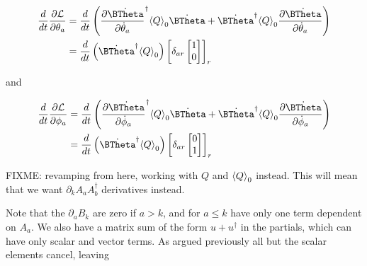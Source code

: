 \begin{align*}
\frac{d}{dt} \PD{\theta_a}{\LL}
&=
\frac{d}{dt} 
\left(
\PD{\dot{\theta}_a}{\dot{\BTheta}}^\dagger
\gpgradezero{Q} 
\dot{\BTheta}
+
\dot{\BTheta}^\dagger
\gpgradezero{Q} 
\PD{\dot{\theta}_a}{\dot{\BTheta}}
\right)  \\
&=
\frac{d}{dt} \left(
\dot{\BTheta}^\dagger
\gpgradezero{Q} \right) 
{\begin{bmatrix}
\delta_{ar}
\begin{bmatrix}
1 \\
0
\end{bmatrix}
\end{bmatrix}}_r
\end{align*}

and

\begin{align*}
\frac{d}{dt} \PD{\phi_a}{\LL}
&=
\frac{d}{dt} 
\left(
\PD{\dot{\phi}_a}{\dot{\BTheta}}^\dagger
\gpgradezero{Q} 
\dot{\BTheta}
+
\dot{\BTheta}^\dagger
\gpgradezero{Q} 
\PD{\dot{\phi}_a}{\dot{\BTheta}}
\right)  \\
&=
\frac{d}{dt} \left(
\dot{\BTheta}^\dagger
\gpgradezero{Q} \right) 
{\begin{bmatrix}
\delta_{ar}
\begin{bmatrix}
0 \\
1 
\end{bmatrix}
\end{bmatrix}}_r
\end{align*}

FIXME: revamping from here, working with $Q$ and ${\left\langle{{Q}}\right\rangle}_{0}$ instead.  This will mean that we want $\partial_k A_a A_b^\dagger$ derivatives instead.

Note that the $\partial_a B_k$ are zero if $a > k$, and for $a \le k$ have only one term dependent on $A_a$.  We also have a matrix sum of the form $u + u^\dagger$ in the partials, which can have only scalar and vector terms.  As argued previously all but the scalar elements cancel, leaving

